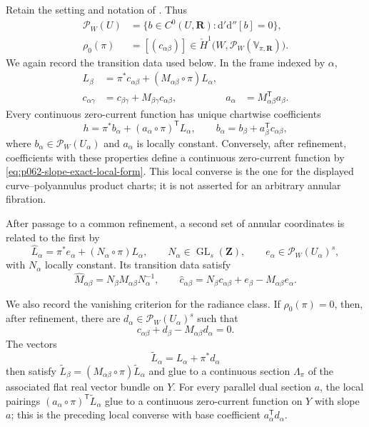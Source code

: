 Retain the setting and notation of
.  Thus
\[
 \begin{aligned}
 \mathscr P_W(U)
 &=\{b\in C^0(U,\mathbf R):\mathrm d'\mathrm d''[b]=0\},\\
 \rho_0(\pi)
 &=[(c_{\alpha\beta})]
   \in\check H^1\bigl(W,\mathscr P_W(\mathbb V_{\pi,\mathbf R})\bigr).
 \end{aligned}
\]
We again record the transition data used below.  In the frame indexed by
$\alpha$,
\begin{align*}
 L_\beta
 &=\pi^*c_{\alpha\beta}
   +(M_{\alpha\beta}\circ\pi)L_\alpha,\\
 c_{\alpha\gamma}
 &=c_{\beta\gamma}+M_{\beta\gamma}c_{\alpha\beta},
 &
 a_\alpha&=M_{\alpha\beta}^{\mathsf T}a_\beta.
\end{align*}
Every continuous zero-current function has unique chartwise coefficients
\begin{equation}
\label{eq:p062-slope-exact-local-form}
 h=\pi^*b_\alpha+(a_\alpha\circ\pi)^{\mathsf T}L_\alpha,
 \qquad
 b_\alpha=b_\beta+a_\beta^{\mathsf T}c_{\alpha\beta},
\end{equation}
where $b_\alpha\in\mathscr P_W(U_\alpha)$ and $a_\alpha$ is locally
constant.  Conversely, after refinement, coefficients with these
properties define a continuous zero-current function by
\eqref{eq:p062-slope-exact-local-form}.  This local converse is the one for
the displayed curve--polyannulus product charts; it is not asserted for an
arbitrary annular fibration.

After passage to a common refinement, a second set of annular coordinates
is related to the first by
\[
 \widehat L_\alpha
 =\pi^*e_\alpha+(N_\alpha\circ\pi)L_\alpha,
 \qquad
 N_\alpha\in\operatorname{GL}_s(\mathbf Z),
 \qquad
 e_\alpha\in\mathscr P_W(U_\alpha)^s,
\]
with $N_\alpha$ locally constant.  Its transition data satisfy
\[
 \widehat M_{\alpha\beta}
 =N_\beta M_{\alpha\beta}N_\alpha^{-1},
 \qquad
 \widehat c_{\alpha\beta}
 =N_\beta c_{\alpha\beta}
  +e_\beta-\widehat M_{\alpha\beta}e_\alpha.
\]

We also record the vanishing criterion for the radiance class.  If
$\rho_0(\pi)=0$, then, after refinement, there are
$d_\alpha\in\mathscr P_W(U_\alpha)^s$ such that
\begin{equation}
\label{eq:p062-slope-exact-radiance-gauge}
 c_{\alpha\beta}+d_\beta-M_{\alpha\beta}d_\alpha=0.
\end{equation}
The vectors
\[
 \widetilde L_\alpha=L_\alpha+\pi^*d_\alpha
\]
then satisfy
$\widetilde L_\beta=(M_{\alpha\beta}\circ\pi)\widetilde L_\alpha$ and
glue to a continuous section $\Lambda_\pi$ of the associated flat real
vector bundle on $Y$.  For every parallel dual section $a$, the local
pairings
$(a_\alpha\circ\pi)^{\mathsf T}\widetilde L_\alpha$ glue to a continuous
zero-current function on $Y$ with slope $a$; this is the
preceding local converse with base coefficient
$a_\alpha^{\mathsf T}d_\alpha$.

